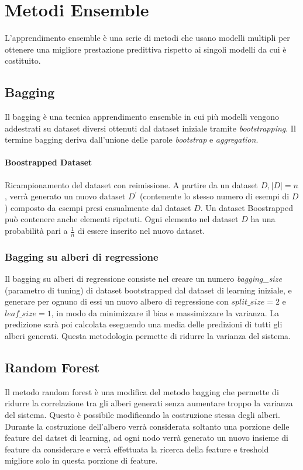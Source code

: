 \documentclass{article}
\begin{document}
    \section{Metodi Ensemble}
    L'apprendimento ensemble è una serie di metodi che usano modelli multipli per ottenere
    una migliore prestazione predittiva rispetto ai singoli modelli da cui è costituito.
    \subsection{Bagging}
    Il bagging è una tecnica apprendimento ensemble in cui più modelli vengono addestrati
    su dataset diversi ottenuti dal dataset iniziale tramite \textit{bootstrapping}. Il 
    termine bagging deriva dall'unione delle parole \textit{bootstrap} e \textit{aggregation}.

    \paragraph{Boostrapped Dataset} Ricampionamento del dataset con reimissione. A partire
    da un dataset $D, |D|=n$, verrà generato un nuovo dataset $D^{'}$ (contenente lo stesso
    numero di esempi di $D$)
    composto da esempi
    presi casualmente dal dataset $D$. Un dataset Boostrapped può contenere anche   
    elementi ripetuti. Ogni elemento nel dataset $D$ ha una probabilità pari a $\frac{1}{n}$
    di essere inserito nel nuovo dataset.

    \subsubsection{Bagging su alberi di regressione}
    Il bagging su alberi di regressione consiste nel creare un numero \textit{bagging\_size} (parametro
    di tuning) di dataset bootstrapped dal dataset di learning iniziale, e generare per 
    ognuno di essi un nuovo albero di regressione con $\textit{split\_size}=2$ e $\textit{leaf\_size}=1$, 
    in modo da minimizzare il bias e massimizzare la varianza.
    La predizione sarà poi 
    calcolata eseguendo una media delle predizioni di tutti gli alberi generati. 
    Questa metodologia permette di ridurre la varianza del sistema.


    \subsection{Random Forest}
    Il metodo random forest è una modifica del metodo bagging che 
    permette di ridurre la correlazione tra gli alberi generati senza
    aumentare troppo la varianza del sistema. Questo è possibile 
    modificando la costruzione stessa degli alberi. Durante la costruzione 
    dell'albero verrà considerata soltanto una porzione delle feature 
    del datset di learning, ad ogni nodo verrà generato un nuovo insieme
    di feature da considerare e verrà effettuata la ricerca della feature e 
    treshold migliore solo in questa porzione di feature.
    
\end{document}
